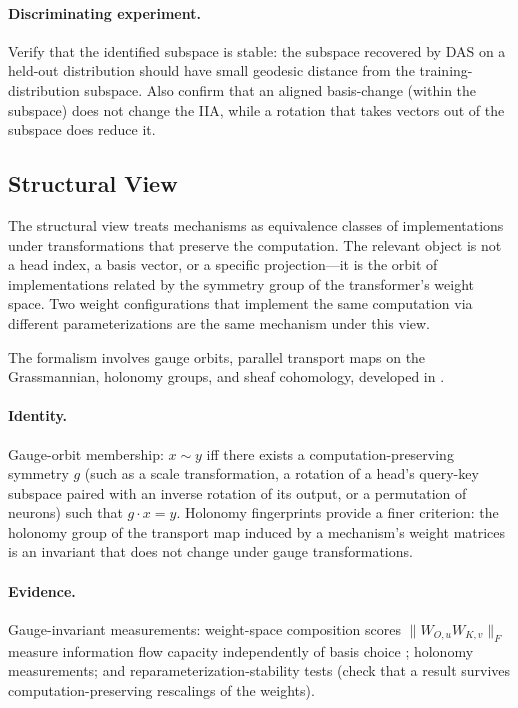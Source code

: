 \documentclass[11pt]{article}
\theoremstyle{remark}
\begin{document}
\paragraph{Discriminating experiment.}
Verify that the identified subspace is stable: the subspace recovered
by DAS on a held-out distribution should have small geodesic distance
from the training-distribution subspace.  Also confirm that
an aligned basis-change (within the subspace) does not change the IIA,
while a rotation that takes vectors out of the subspace does reduce it.

\subsection{Structural View}

The structural view treats mechanisms as equivalence classes of
implementations under transformations that preserve the computation.
The relevant object is not a head index, a basis vector, or a specific
projection---it is the orbit of implementations related by the symmetry
group of the transformer's weight space.  Two weight configurations
that implement the same computation via different parameterizations are
the same mechanism under this view.

The formalism involves gauge orbits, parallel transport maps on the
Grassmannian, holonomy groups, and sheaf cohomology, developed in
\citet{tower2026geom}.

\paragraph{Identity.}
Gauge-orbit membership: $x \sim y$ iff there exists a computation-preserving
symmetry $g$ (such as a scale transformation, a rotation of a head's
query-key subspace paired with an inverse rotation of its output, or a
permutation of neurons) such that $g \cdot x = y$.  Holonomy fingerprints
provide a finer criterion: the holonomy group of the transport map
induced by a mechanism's weight matrices is an invariant that does not
change under gauge transformations.

\paragraph{Evidence.}
Gauge-invariant measurements: weight-space composition scores
$\|W_{O,u} W_{K,v}\|_F$ measure information flow capacity independently
of basis choice \citep{tower2026weight}; holonomy measurements; and
reparameterization-stability tests (check that a result survives
computation-preserving rescalings of the weights).
\end{document}
